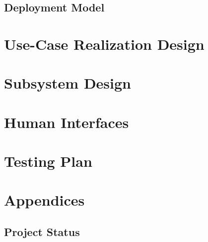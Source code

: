\documentclass[english,12pt]{article}
\begin{document}
\subsection{Deployment Model}
\section{Use-Case Realization Design}
\section{Subsystem Design}
\section{Human Interfaces}
\section{Testing Plan}
\section{Appendices}
\subsection{Project Status}
\end{document}
